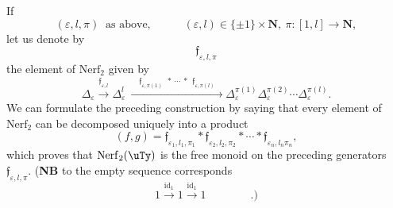 If
\[
(\varepsilon,l,\pi)\ \text{ as above,} \qquad\quad (\varepsilon,l)\in\{\pm1\}\times\mathbf{N},\ \pi : [1,l]\longrightarrow\mathbf{N},
\]
let us denote by
\[
\mathfrak{f}_{\varepsilon,l,\pi}
\]
the element of $\mathrm{Nerf}_2$ given by
\[
\Delta_\varepsilon\xrightarrow{\mathfrak{f}_{\varepsilon,l}}\Delta^l_\varepsilon\ \xrightarrow{\quad\mathfrak{f}_{\varepsilon,\pi(1)}\ \ *\ \cdots\ *\ \ \mathfrak{f}_{\varepsilon,\pi(l)}\quad}\Delta^{\pi(1)}_\varepsilon\Delta^{\pi(2)}_\varepsilon\cdots\Delta^{\pi(l)}_\varepsilon.
\]
We can formulate the preceding construction by saying that every element of $\mathrm{Nerf}_2$ can be decomposed uniquely into a product
\[
(f,g) = \mathfrak{f}_{\varepsilon_1,l_1,\pi_1}*\mathfrak{f}_{\varepsilon_2,l_2,\pi_2}*\cdots*\mathfrak{f}_{\varepsilon_n,l_n\pi_n}, %
\]
which proves that $\mathrm{Nerf}_2(\uTy)$ is the free monoid on the preceding generators $\mathfrak{f}_{\varepsilon,l,\pi}$. (\textbf{NB} to the empty sequence corresponds
\[
1\xrightarrow{\mathrm{id}_1}1\xrightarrow{\mathrm{id}_1}1 \qquad\qquad .)
\]

